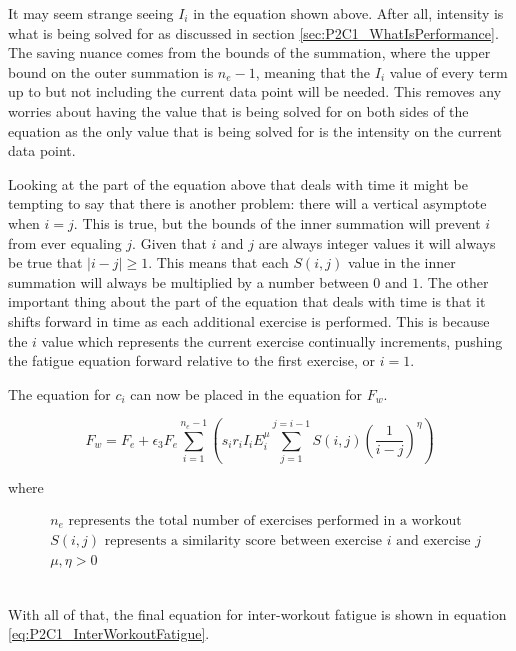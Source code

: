 It may seem strange seeing $I_i$ in the equation shown above. After all, intensity is what is being solved for as discussed in section \ref{sec:P2C1_WhatIsPerformance}. The saving nuance comes from the bounds of the summation, where the upper bound on the outer summation is $n_e-1$, meaning that the $I_i$ value of every term up to but not including the current data point will be needed. This removes any worries about having the value that is being solved for on both sides of the equation as the only value that is being solved for is the intensity on the current data point.

Looking at the part of the equation above that deals with time it might be tempting to say that there is another problem: there will a vertical asymptote when $i=j$. This is true, but the bounds of the inner summation will prevent $i$ from ever equaling $j$. Given that $i$ and $j$ are always integer values it will always be true that $|i-j|\ge1$. This means that each $S(i,j)$ value in the inner summation will always be multiplied by a number between $0$ and $1$. The other important thing about the part of the equation that deals with time is that it shifts forward in time as each additional exercise is performed. This is because the $i$ value which represents the current exercise continually increments, pushing the fatigue equation forward relative to the first exercise, or $i=1$.

The equation for $c_i$ can now be placed in the equation for $F_w$.

\begin{minipage}{\textwidth}
	\begin{equation*}
		F_w =
			F_{e} + 
			\epsilon_3 F_e 
			\sum_{i=1}^{n_e-1} \left( 
				s_i r_i I_i E_i^\mu 
				\sum_{j=1}^{j=i-1} S(i,j)\left(
					\frac{1}{i-j}
				\right)^\eta
			\right)
	\end{equation*}
	\centerline{where}
	\begin{equation*}
		\begin{split}
			& n_e \text{ represents the total number of exercises performed in a workout} \\
			& S(i,j) \text{ represents a similarity score between exercise }i \text{ and exercise }j \\
			& \mu, \eta>0
		\end{split}
	\end{equation*}
\end{minipage}\\

With all of that, the final equation for inter-workout fatigue is shown in equation \ref{eq:P2C1_InterWorkoutFatigue}.

